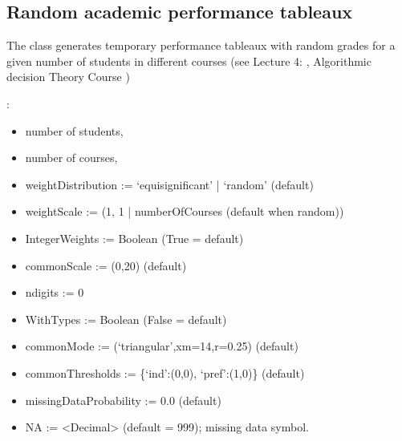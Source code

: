 \documentclass[a4paper,12pt,english]{sphinxhowto}
\begin{document}
\subsection{Random academic performance tableaux}
\label{\detokenize{tutorial:random-academic-performance-tableaux}}
The  class generates temporary performance tableaux with random grades for a given number of students in different courses (see Lecture 4: , Algorithmic decision Theory Course )

:
\begin{itemize}
\item {} 
number of students,

\item {} 
number of courses,

\item {} 
weightDistribution := ‘equisignificant’ | ‘random’ (default)

\item {} 
weightScale := (1, 1 | numberOfCourses (default when random))

\item {} 
IntegerWeights := Boolean (True = default)

\item {} 
commonScale := (0,20) (default)

\item {} 
ndigits := 0

\item {} 
WithTypes := Boolean (False = default)

\item {} 
commonMode := (‘triangular’,xm=14,r=0.25) (default)

\item {} 
commonThresholds := \{‘ind’:(0,0), ‘pref’:(1,0)\} (default)

\item {} 
missingDataProbability := 0.0 (default)

\item {} 
NA := \textless{}Decimal\textgreater{} (default = \sphinxhyphen{}999); missing data symbol.

\end{itemize}
\end{document}

